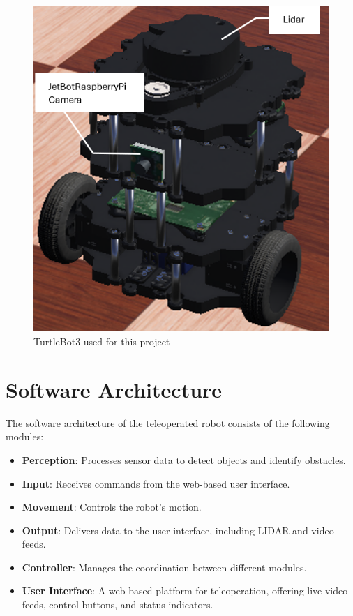 \documentclass{article}
\begin{document}
\newpage
\begin{figure}[h]
    \centering
    \includegraphics[width=0.7\linewidth]{hardware_pictures/TurtleBot3_hardware.png}
    \caption{TurtleBot3 used for this project}
    \label{fig:turtlebot}
\end{figure}

\newpage
\section{Software Architecture}
The software architecture of the teleoperated robot consists of the following modules:

\begin{itemize}
    \item \textbf{Perception}: Processes sensor data to detect objects and identify obstacles.
    \item \textbf{Input}: Receives commands from the web-based user interface.
    \item \textbf{Movement}: Controls the robot's motion.
    \item \textbf{Output}: Delivers data to the user interface, including LIDAR and video feeds.
    \item \textbf{Controller}: Manages the coordination between different modules.
    \item \textbf{User Interface}: A web-based platform for teleoperation, offering live video feeds, control buttons, and status indicators.
\end{itemize}
\end{document}
